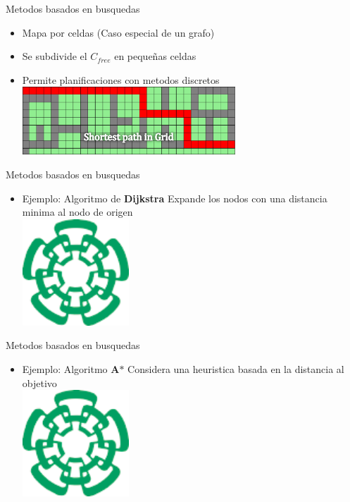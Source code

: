 \documentclass[
	11pt, %
]{beamer}
\begin{document}
\begin{frame}{Metodos basados en busquedas}
  \begin{itemize}
  \item Mapa por celdas (Caso especial de un grafo)\\
  \item Se subdivide el $C_{free}$ en pequeñas celdas\\
  \item Permite planificaciones con metodos discretos\\
    \centering
    \bigskip %
    \includegraphics[width=8cm]{bfs.jpg}
  \end{itemize}
\end{frame}

\begin{frame}{Metodos basados en busquedas}
  \begin{itemize}
  \item Ejemplo: Algoritmo de \textbf{Dijkstra} Expande los nodos con una distancia minima al nodo de origen\\
    \centering
    \includegraphics[angle=45,width=4cm]{cinvestavlogo}
  \end{itemize}
\end{frame}

\begin{frame}{Metodos basados en busquedas}
  \begin{itemize}
  \item Ejemplo: Algoritmo \textbf{A$*$} Considera una heuristica basada en la distancia al objetivo\\
    \centering
    \includegraphics[angle=45,width=4cm]{cinvestavlogo}
  \end{itemize}
\end{frame}
\end{document}

